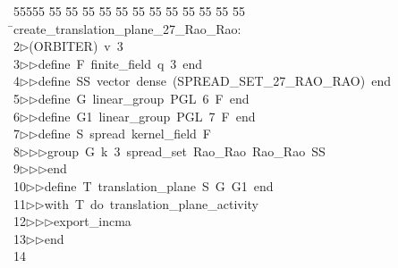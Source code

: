 %
%
\begin{tabbing}
55555 \= 55 \= 55 \= 55 \= 55 \= 55 \= 55 \= 55 \= 55 \= 55 \= 55 \= 55 \= 55 \= \>create\_translation\_plane\_27\_Rao\_Rao:\\[0pt]
2\>$\triangleright$\>(ORBITER)\ v\ 3\ \\[0pt]
3\>$\triangleright$\>$\triangleright$\>define\ F\ finite\_field\ q\ 3\ end\ \\[0pt]
4\>$\triangleright$\>$\triangleright$\>define\ SS\ vector\ dense\ (SPREAD\_SET\_27\_RAO\_RAO)\ end\ \\[0pt]
5\>$\triangleright$\>$\triangleright$\>define\ G\ linear\_group\ PGL\ 6\ F\ end\ \\[0pt]
6\>$\triangleright$\>$\triangleright$\>define\ G1\ linear\_group\ PGL\ 7\ F\ end\ \\[0pt]
7\>$\triangleright$\>$\triangleright$\>define\ S\ spread\ kernel\_field\ F\ \\[0pt]
8\>$\triangleright$\>$\triangleright$\>$\triangleright$\>group\ G\ k\ 3\ spread\_set\ Rao\_Rao\ Rao\_Rao\ SS\ \\[0pt]
9\>$\triangleright$\>$\triangleright$\>$\triangleright$\>end\ \\[0pt]
10\>$\triangleright$\>$\triangleright$\>define\ T\ translation\_plane\ S\ G\ G1\ end\ \\[0pt]
11\>$\triangleright$\>$\triangleright$\>with\ T\ do\ translation\_plane\_activity\ \\[0pt]
12\>$\triangleright$\>$\triangleright$\>$\triangleright$\>export\_incma\ \\[0pt]
13\>$\triangleright$\>$\triangleright$\>end\\[0pt]
14\>\end{tabbing}
